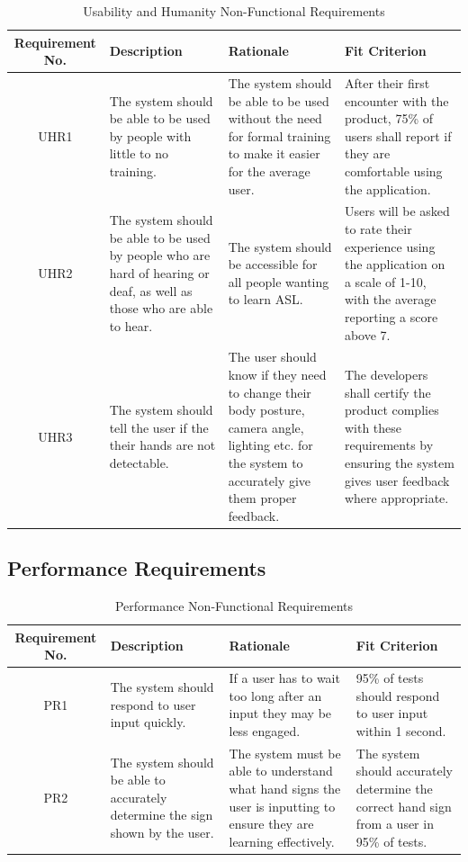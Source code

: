 \documentclass[12pt, titlepage]{article}
\begin{document}
\begin{table}[H]
\caption{Usability and Humanity Non-Functional Requirements}
\noindent \begin{tabular}{| c | p{3cm}| p{3cm}| p{3cm}|}
\hline 
\textbf{Requirement No.} & \textbf{Description} & \textbf{Rationale} & \textbf{Fit Criterion}\\
\hline
UHR1 & The system should be able to be used by people with little to no training. & The system should be able to be used without the need for formal training to make it easier for the average user. & After their first encounter with the product, 75\% of users shall report if they are comfortable using the application.\\
\hline
UHR2 & The system should be able to be used by people who are hard of hearing or deaf, as well as those who are able to hear. & The system should be accessible for all people wanting to learn ASL. & Users will be asked to rate their experience using the application on a scale of 1-10, with the average reporting a score above 7. \\
\hline
UHR3 & The system should tell the user if the their hands are not detectable. & The user should know if they need to change their body posture, camera angle, lighting etc. for the system to accurately give them proper feedback. & The developers shall certify the product complies with these requirements by ensuring the system gives user feedback where appropriate.\\
\bottomrule
\end{tabular}
\end{table}

\subsection{Performance Requirements}

\begin{table}[H]
\caption{Performance Non-Functional Requirements}
\noindent \begin{tabular}{| c | p{3cm}| p{3cm}| p{3cm}|}
\hline 
\textbf{Requirement No.} & \textbf{Description} & \textbf{Rationale} & \textbf{Fit Criterion}\\
\hline
PR1 & The system should respond to user input quickly. & If a user has to wait too long after an input they may be less engaged. & 95\% of tests should respond to user input within 1 second. \\
\hline
PR2 & The system should be able to accurately determine the sign shown by the user. & The system must be able to understand what hand signs the user is inputting to ensure they are learning effectively. & The system should accurately determine the correct hand sign from a user in 95\% of tests. \\
\bottomrule
\end{tabular}
\end{table}
\end{document}
